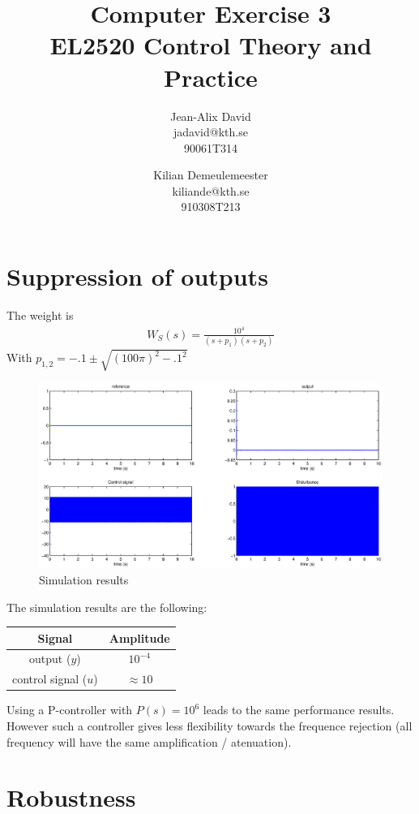 \documentclass[a4paper,11pt]{article}
\title{
	Computer Exercise 3\\
	EL2520 Control Theory and Practice
}
\author{
	Jean-Alix David\\
	jadavid@kth.se\\
	90061T314
	\and
	Kilian Demeulemeester\\
	kiliande@kth.se\\
	910308T213
}
\begin{document}
	\maketitle

	\section*{Suppression of outputs}

	The weight is
	\begin{align*}
        W_S(s) = \frac{10^{4}}{(s+p_1)(s+p_2)} 
	\end{align*}
    With $p_{1,2} = -.1 \pm \sqrt{(100\pi)^2-.1^2}$ 

    \begin{figure}[h!b]
        \centering
        \includegraphics[width=.75\columnwidth]{fig/figure1.eps}
        \caption{Simulation results}
    \end{figure}

    The simulation results are the following:
    \begin{center}
        \begin{tabular}{|c|c|}
        \hline
        \textbf{Signal} & \textbf{Amplitude} \\
        \hline
        output ($y$) & $10^{-4}$ \\
        \hline
        control signal ($u$) & $\approx 10$ \\
        \hline
        \end{tabular}
    \end{center}

    Using a P-controller with $P(s) = 10^6$ leads to the same performance results. 
    However such a controller gives less flexibility towards the frequence rejection (all frequency will have the same amplification / atenuation).

	\section*{Robustness}
\end{document}
